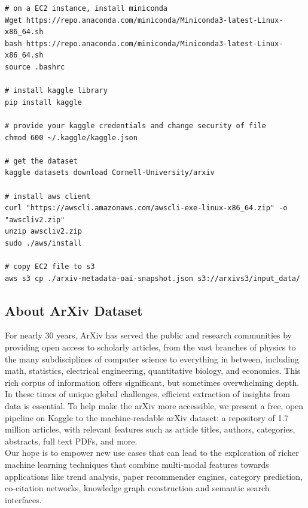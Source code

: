 \begin{mdframed}[backgroundcolor=light-gray, roundcorner=10pt,leftmargin=0, rightmargin=0, innerleftmargin=15, innertopmargin=15,innerbottommargin=15, outerlinewidth=0, linecolor=light-gray]
\begin{lstlisting}[caption={From kaggle to S3 file transfer.},label={transfer}] 
# on a EC2 instance, install miniconda
Wget https://repo.anaconda.com/miniconda/Miniconda3-latest-Linux-x86_64.sh
bash https://repo.anaconda.com/miniconda/Miniconda3-latest-Linux-x86_64.sh
source .bashrc

# install kaggle library
pip install kaggle

# provide your kaggle credentials and change security of file
chmod 600 ~/.kaggle/kaggle.json

# get the dataset
kaggle datasets download Cornell-University/arxiv

# install aws client
curl "https://awscli.amazonaws.com/awscli-exe-linux-x86_64.zip" -o "awscliv2.zip"
unzip awscliv2.zip
sudo ./aws/install

# copy EC2 file to s3
aws s3 cp ./arxiv-metadata-oai-snapshot.json s3://arxivs3/input_data/
\end{lstlisting}
\end{mdframed} 



\subsection{About ArXiv Dataset}
For nearly 30 years, ArXiv has served the public and research communities by providing open access to scholarly articles, from the vast branches of physics to the many subdisciplines of computer science to everything in between, including math, statistics, electrical engineering, quantitative biology, and economics. This rich corpus of information offers significant, but sometimes overwhelming depth.\\

In these times of unique global challenges, efficient extraction of insights from data is essential. To help make the arXiv more accessible, we present a free, open pipeline on Kaggle to the machine-readable arXiv dataset: a repository of 1.7 million articles, with relevant features such as article titles, authors, categories, abstracts, full text PDFs, and more.\\

Our hope is to empower new use cases that can lead to the exploration of richer machine learning techniques that combine multi-modal features towards applications like trend analysis, paper recommender engines, category prediction, co-citation networks, knowledge graph construction and semantic search interfaces.\\

